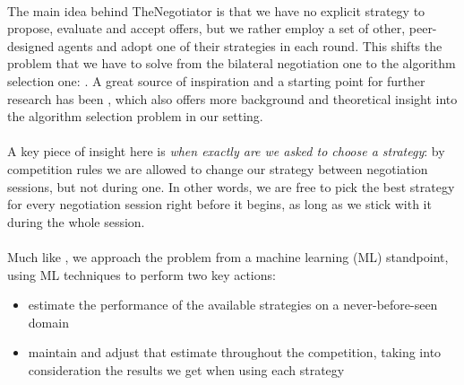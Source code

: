 \paragraph*{}
The main idea behind TheNegotiator is that we have no explicit strategy to propose, evaluate and accept offers, but we rather employ a set of other, peer-designed agents and adopt one of their strategies in each round. 
This shifts the problem that we have to solve from the bilateral negotiation one to the algorithm selection one:  \cite{original_alg_selection_paper_1975}. A great source of inspiration and a starting point for further research has been \cite{meta_agent_paper}, which also offers more background and theoretical insight into the algorithm selection problem in our setting.

\paragraph*{}
A key piece of insight here is \emph{when exactly are we asked to choose a strategy}: by competition rules we are allowed to change our strategy between negotiation sessions, but not during one.
In other words, we are free to pick the best strategy for every negotiation session right before it begins, as long as we stick with it during the whole session.

\paragraph*{}
Much like \cite{meta_agent_paper}, we approach the problem from a machine learning (ML) standpoint, using ML techniques to perform two key actions:
\begin{itemize}
    \item estimate the performance of the available strategies on a never-before-seen domain
    \item maintain and adjust that estimate throughout the competition, taking into consideration the results we get when using each strategy
\end{itemize}
